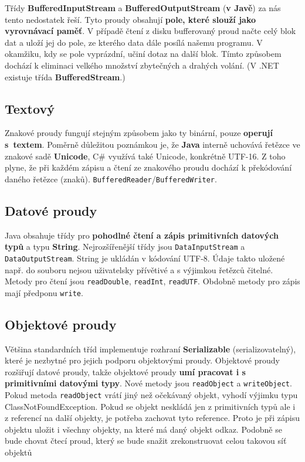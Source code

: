 Třídy \textbf{BufferedInputStream} a \textbf{BufferedOutputStream} (\textbf{v Javě}) za nás tento nedostatek řeší. Tyto proudy obsahují \textbf{pole, které slouží jako vyrovnávací paměť}. V případě čtení z disku bufferovaný proud načte celý blok dat a uloží jej do pole, ze kterého data dále posílá našemu programu. V okamžiku, kdy se pole vyprázdní, učiní dotaz na další blok. Tímto způsobem dochází k eliminaci velkého množství zbytečných a drahých volání. (V .NET existuje třída \textbf{BufferedStream}.)

\subsection{Textový}
Znakové proudy fungují stejným způsobem jako ty binární, pouze \textbf{operují s textem}. Poměrně důležitou poznámkou je, že \textbf{Java} interně uchovává řetězce ve znakové sadě \textbf{Unicode}, C\# využívá také Unicode, konkrétně UTF-16. Z toho plyne, že při každém zápisu a čtení ze znakového proudu dochází k překódování daného řetězce (znaků). \texttt{BufferedReader}/\texttt{BufferedWriter}.

\subsection{Datové proudy}
Java obsahuje třídy pro \textbf{pohodlné čtení a zápis primitivních datových typů} a typu \textbf{String}. Nejrozšířenější třídy jsou \texttt{DataInputStream} a \texttt{DataOutputStream}. String je ukládán v kódování UTF-8. Údaje takto uložené např. do souboru nejsou uživatelsky přívětivé a s výjimkou řetězců čitelné. Metody pro čtení jsou \texttt{readDouble}, \texttt{readInt}, \texttt{readUTF}. Obdobně metody pro zápis mají předponu \texttt{write}.

\subsection{Objektové proudy}
Většina standardních tříd implementuje rozhraní \textbf{Serializable} (serializovatelný), které je nezbytné pro jejich podporu objektovými proudy. Objektové proudy rozšiřují datové proudy, takže objektové proudy \textbf{umí pracovat i s primitivními datovými typy}. Nové metody jsou \texttt{readObject} a \texttt{writeObject}. Pokud metoda \texttt{readObject} vrátí jiný než očekávaný objekt, vyhodí výjimku typu ClassNotFoundException. Pokud se objekt neskládá jen z primitivních typů ale i z referencí na další objekty, je potřeba zachovat tyto reference. Proto je při zápisu objektu uložit i všechny objekty, na které má daný objekt odkaz. Podobně se bude chovat čtecí proud, který se bude snažit zrekonstruovat celou takovou síť objektů

